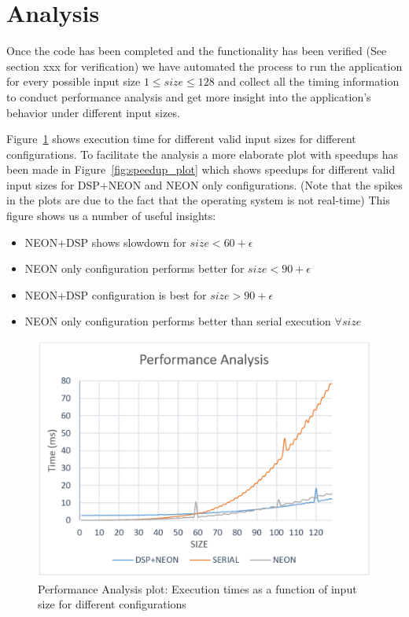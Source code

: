 \newpage
\section{Analysis}

Once the code has been completed and the functionality has been verified (See section xxx for verification) we have automated the process to run the application for every possible input size $1 \leq size \leq 128$ and collect all the timing information to conduct performance analysis and get more insight into the application's behavior under different input sizes.

Figure~\ref{fig:perf_plot} shows execution time for different valid input sizes for different configurations. To facilitate the analysis a more elaborate plot with speedups has been made in Figure~\ref{fig:speedup_plot} which shows speedups for different valid input sizes for DSP+NEON and NEON only configurations. (Note that the spikes in the plots are due to the fact that the operating system is not real-time) This figure shows us a number of useful insights:

\begin{itemize}
\item{NEON+DSP shows slowdown for $size < 60 + \epsilon$}
\item{NEON only configuration performs better for $size < 90 + \epsilon$}
\item{NEON+DSP configuration is best for $size >90 + \epsilon$}
\item{NEON only configuration performs better than serial execution $ \forall size$}

\end{itemize}



\begin{figure}[h!]
\includegraphics[width=\textwidth]{analysis/perf_plot}
\caption{Performance Analysis plot: Execution times as a function of input size for different configurations}
\label{fig:perf_plot}
\end{figure}


